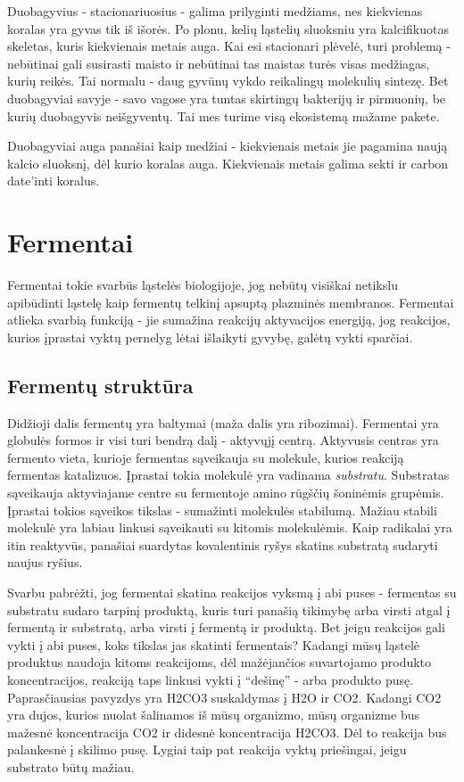 \documentclass[]{book}
\begin{document}
Duobagyvius - stacionariuosius - galima prilyginti medžiams, nes kiekvienas koralas yra gyvas tik iš išorės. Po plonu, kelių ląstelių sluoksniu yra kalcifikuotas skeletas, kuris kiekvienais metais auga. Kai esi stacionari plėvelė, turi problemą - nebūtinai gali susirasti maisto ir nebūtinai tas maistas turės visas medžiagas, kurių reikės. Tai normalu - daug gyvūnų vykdo reikalingų molekulių sintezę. Bet duobagyviai savyje - savo vagose yra tuntas skirtingų bakterijų ir pirmuonių, be kurių duobagyvis neišgyventų. Tai mes turime visą ekosistemą mažame pakete.

Duobagyviai auga panašiai kaip medžiai - kiekvienais metais jie pagamina naują kalcio sluoksnį, dėl kurio koralas auga. Kiekvienais metais galima sekti ir carbon date'inti koralus.

\hypertarget{fermentai}{%
\chapter{Fermentai}\label{fermentai}}

Fermentai tokie svarbūs ląstelės biologijoje, jog nebūtų visiškai netikslu apibūdinti ląstelę kaip fermentų telkinį apsuptą plazminės membranos. Fermentai atlieka svarbią funkciją - jie sumažina reakcijų aktyvacijos energiją, jog reakcijos, kurios įprastai vyktų pernelyg lėtai išlaikyti gyvybę, galėtų vykti sparčiai.

\hypertarget{fermentu-struktura}{%
\section{Fermentų struktūra}\label{fermentu-struktura}}

Didžioji dalis fermentų yra baltymai (maža dalis yra ribozimai). Fermentai yra globulės formos ir visi turi bendrą dalį - aktyvųjį centrą. Aktyvusis centras yra fermento vieta, kurioje fermentas sąveikauja su molekule, kurios reakciją fermentas katalizuos. Įprastai tokia molekulė yra vadinama \emph{substratu}. Substratas sąveikauja aktyviajame centre su fermentoje amino rūgščių šoninėmis grupėmis. Įprastai tokios sąveikos tikslas - sumažinti molekulės stabilumą. Mažiau stabili molekulė yra labiau linkusi sąveikauti su kitomis molekulėmis. Kaip radikalai yra itin reaktyvūs, panašiai suardytas kovalentinis ryšys skatins substratą sudaryti naujus ryšius.

Svarbu pabrėžti, jog fermentai skatina reakcijos vyksmą į abi puses - fermentas su substratu sudaro tarpinį produktą, kuris turi panašią tikimybę arba virsti atgal į fermentą ir substratą, arba virsti į fermentą ir produktą. Bet jeigu reakcijos gali vykti į abi puses, koks tikslas jas skatinti fermentais? Kadangi mūsų ląstelė produktus naudoja kitoms reakcijoms, dėl mažėjančios suvartojamo produkto koncentracijos, reakciją taps linkusi vykti į ``dešinę'' - arba produkto pusę. Paprasčiausias pavyzdys yra H2CO3 suskaldymas į H2O ir CO2. Kadangi CO2 yra dujos, kurios nuolat šalinamos iš mūsų organizmo, mūsų organizme bus mažesnė koncentracija CO2 ir didesnė koncentracija H2CO3. Dėl to reakcija bus palankesnė į skilimo pusę. Lygiai taip pat reakcija vyktų priešingai, jeigu substrato būtų mažiau.
\end{document}
